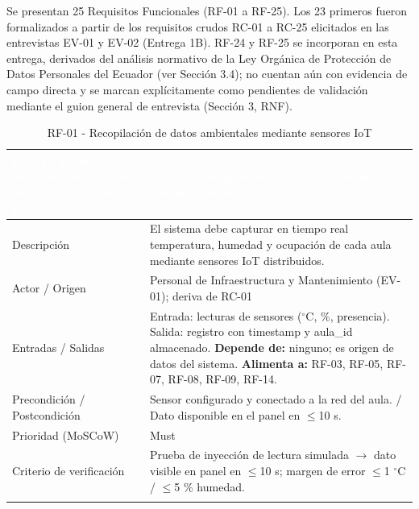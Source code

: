 
Se presentan 25 Requisitos Funcionales (RF-01 a RF-25). Los 23 primeros fueron formalizados a partir de los requisitos crudos RC-01 a RC-25 elicitados en las entrevistas EV-01 y EV-02 (Entrega 1B). RF-24 y RF-25 se incorporan en esta entrega, derivados del análisis normativo de la Ley Orgánica de Protección de Datos Personales del Ecuador (ver Sección 3.4); no cuentan aún con evidencia de campo directa y se marcan explícitamente como pendientes de validación mediante el guion general de entrevista (Sección 3, RNF).


\begingroup
\small
\begin{longtable}{|P{0.5000}|P{0.5000}|}
\hline
{}\textcolor{white}{\textbf{RF-01 - Recopilación de datos ambientales mediante sensores IoT}} & \textcolor{white}{\textbf{RF-01 - Recopilación de datos ambientales mediante sensores IoT}} \\ \hline
Descripción & El sistema debe capturar en tiempo real temperatura, humedad y ocupación de cada aula mediante sensores IoT distribuidos. \\ \hline
Actor / Origen & Personal de Infraestructura y Mantenimiento (EV-01); deriva de RC-01 \\ \hline
Entradas / Salidas & Entrada: lecturas de sensores ($^{\circ}$C, \%, presencia). Salida: registro con timestamp y aula\_id almacenado. \textbf{Depende de:} ninguno; es origen de datos del sistema. \textbf{Alimenta a:} RF-03, RF-05, RF-07, RF-08, RF-09, RF-14. \\ \hline
Precondición / Postcondición & Sensor configurado y conectado a la red del aula. / Dato disponible en el panel en $\leq$10 s. \\ \hline
Prioridad (MoSCoW) & Must \\ \hline
Criterio de verificación & Prueba de inyección de lectura simulada $\rightarrow$ dato visible en panel en $\leq$10 s; margen de error $\leq$1 $^{\circ}$C / $\leq$5 \% humedad. \\ \hline
\caption{RF-01 - Recopilación de datos ambientales mediante sensores IoT}
\end{longtable}
\endgroup

